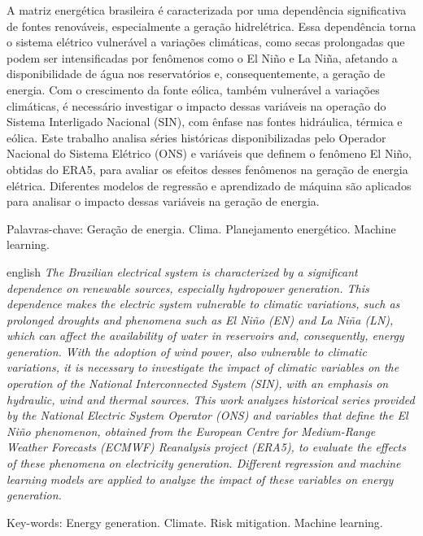 \begin{resumo}
\noindent
A matriz energética brasileira é caracterizada por uma dependência significativa de fontes renováveis, especialmente a
geração hidrelétrica. Essa dependência torna o sistema elétrico vulnerável a variações climáticas, como secas 
prolongadas que podem ser intensificadas por fenômenos como o El Niño e La Niña, afetando a disponibilidade 
de água nos reservatórios e, consequentemente, a geração de energia. Com o crescimento da fonte eólica, também vulnerável a 
variações climáticas, é necessário investigar o impacto dessas variáveis na operação do Sistema Interligado Nacional 
(SIN), com ênfase nas fontes hidráulica, térmica e eólica. Este trabalho analisa séries históricas disponibilizadas pelo Operador Nacional 
do Sistema Elétrico (ONS) e variáveis que definem o fenômeno El Niño, obtidas do ERA5, para avaliar os efeitos desses fenômenos
na geração de energia elétrica. Diferentes modelos de regressão e aprendizado de máquina são aplicados para analisar
o impacto dessas variáveis na geração de energia.

\vspace{0.2cm}
\noindent
Palavras-chave: Geração de energia. Clima. Planejamento energético. Machine learning.
\end{resumo}

\begin{resumo}[Abstract]	
\begin{otherlanguage*}{english}
\noindent 
\textit{The Brazilian electrical system is characterized by a significant dependence on renewable sources, especially hydropower generation. 
This dependence makes the electric system vulnerable to climatic variations, such as prolonged droughts and phenomena such as
El Niño (EN) and La Niña (LN), which can affect the availability of water in reservoirs and, consequently, energy generation. 
With the adoption of wind power, also vulnerable to climatic variations, it is necessary to investigate the impact of 
climatic variables on the operation of the National Interconnected System (SIN), with an emphasis on hydraulic, wind and 
thermal sources. This work analyzes historical series provided by the National Electric System Operator (ONS) and variables 
that define the El Niño phenomenon, obtained from the European Centre for Medium-Range Weather Forecasts (ECMWF) 
Reanalysis project (ERA5), to evaluate the effects of these phenomena on electricity generation. 
Different regression and machine learning models are applied to analyze the impact of these variables on energy generation.}

\vspace{0.2cm}
\noindent
Key-words: Energy generation. Climate. Risk mitigation. Machine learning.
\end{otherlanguage*}
\end{resumo}